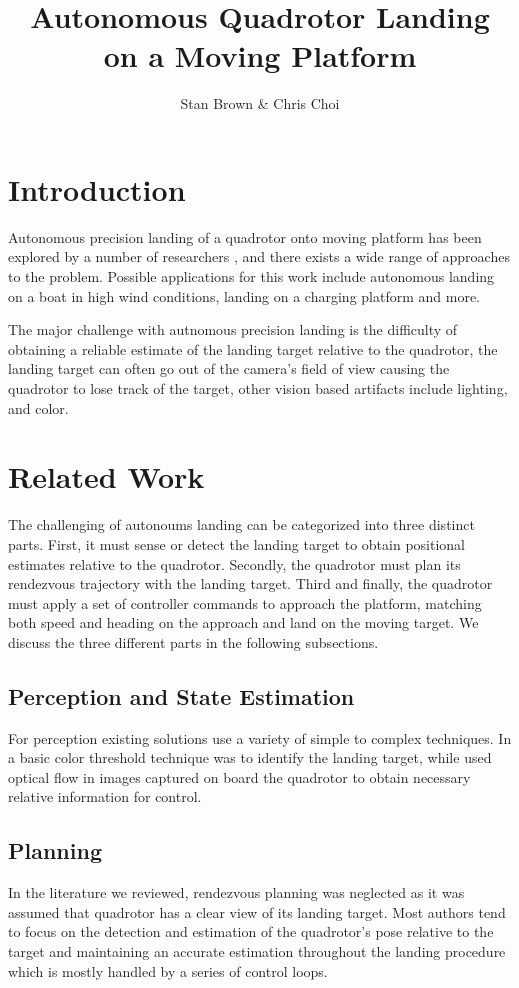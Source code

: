 \documentclass[11pt, twocolumn]{article}
\begin{document}
\title{Autonomous Quadrotor Landing on a Moving Platform}
\author{Stan Brown \& Chris Choi}
\date{}
\maketitle


\section{Introduction}
Autonomous 	precision landing of a quadrotor onto moving platform has been explored by a number of researchers \cite{Lee2012, Kim2014, Voos2010, Friis2009, Ling2014, Herisse2012}, and there exists a wide range of approaches to the problem. Possible applications for this work include autonomous landing on a boat in high wind conditions, landing on a charging platform and more.

The major challenge with autnomous precision landing is the difficulty of obtaining a reliable estimate of the landing target relative to the quadrotor, the landing target can often go out of the camera's field of view causing the quadrotor to lose track of the target, other vision based artifacts include lighting, and color.


\section{Related Work}
The challenging of autonoums landing can be categorized into three distinct parts. First, it must sense or detect the landing target to obtain positional estimates relative to the quadrotor. Secondly, the quadrotor must plan its rendezvous trajectory with the landing target. Third and finally, the quadrotor must apply a set of controller commands to approach the platform, matching both speed and heading on the approach and land on the moving target. We discuss the three different parts in the following subsections.

\subsection{Perception and State Estimation}
For perception existing solutions use a variety of simple to complex techniques. In  \cite{Kim2014} a basic color threshold technique was to identify the landing target, while \cite{Herisse2012} used optical flow in images captured on board the quadrotor to obtain necessary relative information for control. 

\subsection{Planning}
In the literature we reviewed, rendezvous planning was neglected as it was assumed that quadrotor has a clear view of its landing target. Most authors tend to focus on the detection and estimation of the quadrotor's pose relative to the target and maintaining an accurate estimation throughout the landing procedure which is mostly handled by a series of control loops.
\end{document}
